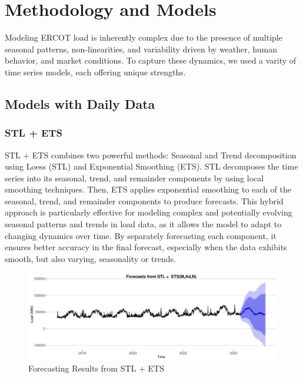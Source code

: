 \documentclass[
]{article}
\begin{document}
\section{Methodology and Models}\label{methodology-and-models}

Modeling ERCOT load is inherently complex due to the presence of
multiple seasonal patterns, non-linearities, and variability driven by
weather, human behavior, and market conditions. To capture these
dynamics, we used a varity of time series models, each offering unique
strengths.

\subsection{Models with Daily Data}\label{models-with-daily-data}

\subsubsection{STL + ETS}\label{stl-ets}

STL + ETS combines two powerful methods: Seasonal and Trend
decomposition using Loess (STL) and Exponential Smoothing (ETS). STL
decomposes the time series into its seasonal, trend, and remainder
components by using local smoothing techniques. Then, ETS applies
exponential smoothing to each of the seasonal, trend, and remainder
components to produce forecasts. This hybrid approach is particularly
effective for modeling complex and potentially evolving seasonal
patterns and trends in load data, as it allows the model to adapt to
changing dynamics over time. By separately forecasting each component,
it ensures better accuracy in the final forecast, especially when the
data exhibits smooth, but also varying, seasonality or trends.

\begin{figure}
\centering
\includegraphics{FinalProject_Report_files/figure-latex/unnamed-chunk-4-1.pdf}
\caption{Forecasting Results from STL + ETS}
\end{figure}
\end{document}
